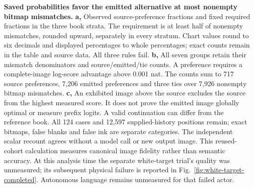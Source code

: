 \textbf{Saved probabilities favor the emitted alternative at most nonempty bitmap mismatches.}
\textbf{a,} Observed source-preference fractions and fixed required fractions in
the three book strata. The requirement is at least half of nonempty mismatches,
rounded upward, separately in every stratum. Chart values round to six decimals
and displayed percentages to whole percentages; exact counts remain in the
table and source data. All three rules fail. \textbf{b,} All seven groups retain
their mismatch denominators and source/emitted/tie counts. A preference requires
a complete-image log-score advantage above 0.001 nat. The counts sum to 717
source preferences, 7,206 emitted preferences and three ties over 7,926 nonempty
bitmap mismatches. \textbf{c,} An exhibited image above the source excludes the
source from the highest measured score. It does not prove the emitted image
globally optimal or measure prefix logits. A valid continuation can differ from
the reference book. All 124 cases and 12,597 supplied-history positions remain;
exact bitmaps, false blanks and false ink are separate categories. The independent
scalar recount agrees without a model call or new output image. This reused-cohort
calculation measures canonical image fidelity rather than semantic accuracy.
At this analysis time the separate white-target trial's quality was unmeasured;
its subsequent physical failure is reported in Fig.~\ref{fig:white-target-completed}.
Autonomous language remains unmeasured for that failed actor.
